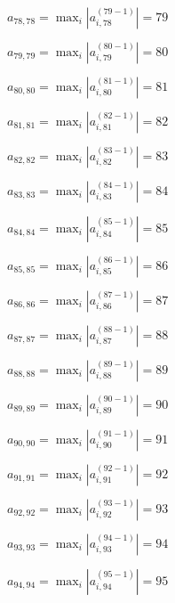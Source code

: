 \documentclass[a4paper,12pt]{article}
\begin{document}
$a _{ 78, 78 } =  \max _i |a _{ i, 78 } ^{ (79 - 1) } | = 79$

$a _{ 79, 79 } =  \max _i |a _{ i, 79 } ^{ (80 - 1) } | = 80$

$a _{ 80, 80 } =  \max _i |a _{ i, 80 } ^{ (81 - 1) } | = 81$

$a _{ 81, 81 } =  \max _i |a _{ i, 81 } ^{ (82 - 1) } | = 82$

$a _{ 82, 82 } =  \max _i |a _{ i, 82 } ^{ (83 - 1) } | = 83$

$a _{ 83, 83 } =  \max _i |a _{ i, 83 } ^{ (84 - 1) } | = 84$

$a _{ 84, 84 } =  \max _i |a _{ i, 84 } ^{ (85 - 1) } | = 85$

$a _{ 85, 85 } =  \max _i |a _{ i, 85 } ^{ (86 - 1) } | = 86$

$a _{ 86, 86 } =  \max _i |a _{ i, 86 } ^{ (87 - 1) } | = 87$

$a _{ 87, 87 } =  \max _i |a _{ i, 87 } ^{ (88 - 1) } | = 88$

$a _{ 88, 88 } =  \max _i |a _{ i, 88 } ^{ (89 - 1) } | = 89$

$a _{ 89, 89 } =  \max _i |a _{ i, 89 } ^{ (90 - 1) } | = 90$

$a _{ 90, 90 } =  \max _i |a _{ i, 90 } ^{ (91 - 1) } | = 91$

$a _{ 91, 91 } =  \max _i |a _{ i, 91 } ^{ (92 - 1) } | = 92$

$a _{ 92, 92 } =  \max _i |a _{ i, 92 } ^{ (93 - 1) } | = 93$

$a _{ 93, 93 } =  \max _i |a _{ i, 93 } ^{ (94 - 1) } | = 94$

$a _{ 94, 94 } =  \max _i |a _{ i, 94 } ^{ (95 - 1) } | = 95$
\end{document}
